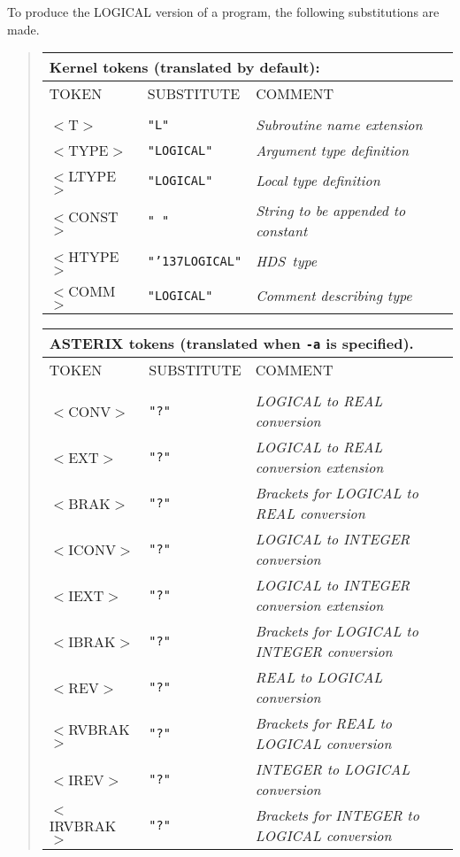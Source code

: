 \documentclass[twoside,11pt]{article}
\renewcommand{\_}{{\tt\char'137}}     %
\newcommand{\HDS}{{\footnotesize HDS}\normalsize}
\begin{document}
To produce the LOGICAL version of a program, the following substitutions
are made.
\begin{quote}
\begin{tabular}{lll}
\multicolumn{3}{l}{\bf{Kernel} tokens (translated by default):}\\
\hline
TOKEN      &SUBSTITUTE      &COMMENT \\
\\
$<$T$>$        &{\tt "L"}         &{\em Subroutine name extension}\\
$<$TYPE$>$     &{\tt "LOGICAL"}   &{\em Argument type definition}\\
$<$LTYPE$>$    &{\tt "LOGICAL"}   &{\em Local type definition}\\
$<$CONST$>$    &{\tt " "}         &{\em String to be appended to constant}\\
$<$HTYPE$>$    &{\tt "\_LOGICAL"} &{\em \HDS\ type}\\
$<$COMM$>$     &{\tt "LOGICAL"}   &{\em Comment describing type}\\
\end{tabular}

\begin{tabular}{lll}
\multicolumn{3}{l}{\bf{ASTERIX} tokens (translated when {\tt -a} is specified).}\\
\hline
TOKEN      &SUBSTITUTE      &COMMENT\\
\\
$<$CONV$>$     &{\tt "?"} &{\em LOGICAL to REAL conversion}\\
$<$EXT$>$      &{\tt "?"} &{\em LOGICAL to REAL conversion extension}\\
$<$BRAK$>$     &{\tt "?"} &{\em Brackets for LOGICAL to REAL conversion}\\
$<$ICONV$>$    &{\tt "?"} &{\em LOGICAL to INTEGER conversion}\\
$<$IEXT$>$     &{\tt "?"} &{\em LOGICAL to INTEGER conversion extension}\\
$<$IBRAK$>$    &{\tt "?"} &{\em Brackets for LOGICAL to INTEGER conversion}\\
$<$REV$>$      &{\tt "?"} &{\em REAL to LOGICAL conversion}\\
$<$RVBRAK$>$   &{\tt "?"} &{\em Brackets for REAL to LOGICAL conversion}\\
$<$IREV$>$     &{\tt "?"} &{\em INTEGER to LOGICAL conversion}\\
$<$IRVBRAK$>$  &{\tt "?"} &{\em Brackets for INTEGER to LOGICAL conversion}\\
\end{tabular}
\end{quote}
\end{document}
